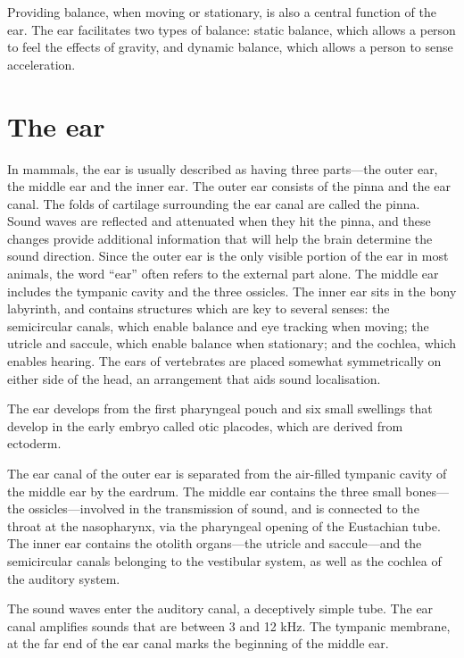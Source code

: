 Providing balance, when moving or stationary, is also a central function of the ear. The ear facilitates two types of balance: static balance, which allows a person to feel the effects of gravity, and dynamic balance, which allows a person to sense acceleration.

\hypertarget{the-ear}{%
\section{The ear}\label{the-ear}}

In mammals, the ear is usually described as having three parts---the outer ear, the middle ear and the inner ear. The outer ear consists of the pinna and the ear canal. The folds of cartilage surrounding the ear canal are called the pinna. Sound waves are reflected and attenuated when they hit the pinna, and these changes provide additional information that will help the brain determine the sound direction. Since the outer ear is the only visible portion of the ear in most animals, the word ``ear'' often refers to the external part alone. The middle ear includes the tympanic cavity and the three ossicles. The inner ear sits in the bony labyrinth, and contains structures which are key to several senses: the semicircular canals, which enable balance and eye tracking when moving; the utricle and saccule, which enable balance when stationary; and the cochlea, which enables hearing. The ears of vertebrates are placed somewhat symmetrically on either side of the head, an arrangement that aids sound localisation.

The ear develops from the first pharyngeal pouch and six small swellings that develop in the early embryo called otic placodes, which are derived from ectoderm.

The ear canal of the outer ear is separated from the air-filled tympanic cavity of the middle ear by the eardrum. The middle ear contains the three small bones---the ossicles---involved in the transmission of sound, and is connected to the throat at the nasopharynx, via the pharyngeal opening of the Eustachian tube. The inner ear contains the otolith organs---the utricle and saccule---and the semicircular canals belonging to the vestibular system, as well as the cochlea of the auditory system.

The sound waves enter the auditory canal, a deceptively simple tube. The ear canal amplifies sounds that are between 3 and 12 kHz. The tympanic membrane, at the far end of the ear canal marks the beginning of the middle ear.


